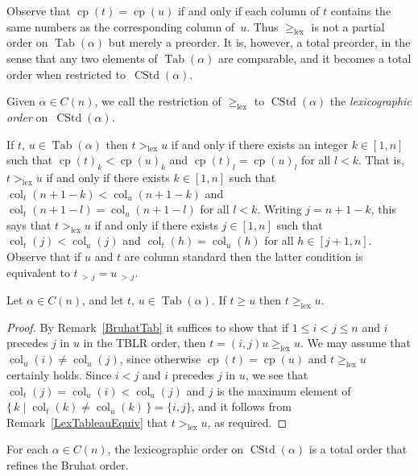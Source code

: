 \documentclass[ALCO,ThmDefs,Unicode,epreuves]{cedram}
\DeclareMathOperator{\cp}{cp}
\DeclareMathOperator{\lex}{lex}
\DeclareMathOperator{\col}{col}
\newcommand{\morethan}[2]{#1\,{_{>\,#2}}}
\DeclareMathOperator{\CSTD}{CStd}
\DeclareMathOperator{\Tab}{Tab}
\begin{document}
Observe that $\cp(t)=\cp(u)$ if and only if each column of $t$
contains the same numbers as the corresponding column of~$u$. Thus
$\geqslant_{\lex}$ is not a partial order on $\Tab(\alpha)$ but
merely a preorder. It is, however, a total preorder, in the sense that
any two elements of $\Tab(\alpha)$ are comparable, and it becomes a total order
when restricted to~$\CSTD(\alpha)$.

\begin{defi}\label{Lexicographic Order Tableaux} Given $\alpha\in C(n)$,
we call the restriction of $\geqslant_{\lex}$ to $\CSTD(\alpha)$
the \emph{lexicographic order} on~$\CSTD(\alpha)$.
\end{defi}

\begin{rema}\label{LexTableauEquiv}
If $t,\,u\in\Tab(\alpha)$ then $t>_{\lex}u$ if and only if
there exists an integer $k\in[1,n]$ such
that $\cp(t)_k<\cp(u)_k$ and $\cp(t)_l=\cp(u)_l$ for all $l<k$.
That is, $t>_{\lex}u$ if and only if there exists $k\in[1,n]$ such
that $\col_t(n+1-k)<\col_u(n+1-k)$ and $\col_t(n+1-l)=\col_u(n+1-l)$
for all $l<k$. Writing $j=n+1-k$, this says that $t>_{\lex}u$ if
and only if there exists $j\in[1,n]$ such that $\col_t(j)<\col_u(j)$
and $\col_t(h)=\col_u(h)$ for all $h\in[j+1,n]$. Observe that if
$u$ and $t$ are column standard then the latter condition
is equivalent to $\morethan tj =\morethan uj$.
\end{rema}

\begin{lemm}\label{bruhatimplieslextableau}
Let $\alpha\in C(n)$, and let $t,\,u\in\Tab(\alpha)$. If
$t\geqslant u$ then $t\geqslant_{\lex} u$.
\end{lemm}

\begin{proof}
By Remark~\ref{BruhatTab} it suffices to show that if $1\leqslant i<j\leqslant n$
and $i$ precedes $j$ in $u$ in the TBLR order, then
$t=(i,j)u\geqslant_{\lex}u$. We may assume that $\col_u(i)\ne\col_u(j)$, since
otherwise $\cp(t)=\cp(u)$ and $t\geqslant_{\lex}u$ certainly holds.
Since $i<j$ and $i$ precedes $j$ in $u$, we see that $\col_t(j)=\col_u(i)<\col_u(j)$
and $j$ is the maximum element of $\{\,k\mid\col_t(k)\ne\col_u(k)\,\}=\{i,j\}$,
and it follows from Remark~\ref{LexTableauEquiv} that $t>_{\lex}u$, as required.
\end{proof}

\begin{coro}\label{domimplieslextableau}
For each $\alpha\in C(n)$, the lexicographic order on $\CSTD(\alpha)$
is a total order that refines the Bruhat order.
\end{coro}
\end{document}
